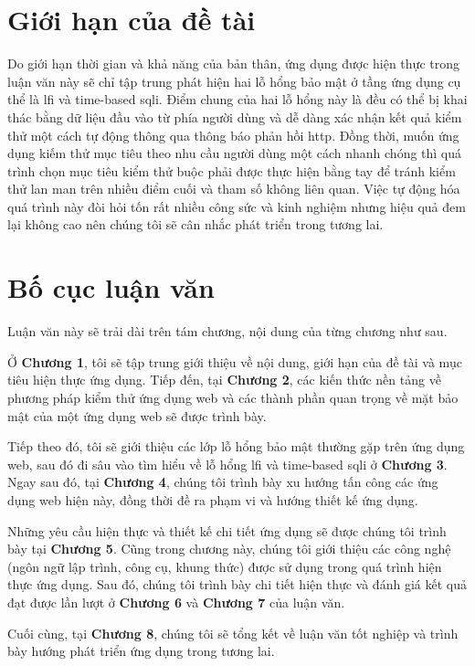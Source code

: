 \section{Giới hạn của đề tài}
Do giới hạn thời gian và khả năng của bản thân, ứng dụng được hiện thực trong luận văn này sẽ chỉ tập trung phát hiện hai lỗ hổng bảo mật ở tầng ứng dụng cụ thể là \acrfull{lfi} và time-based \acrfull{sqli}. Điểm chung của hai lỗ hổng này là đều có thể bị khai thác bằng dữ liệu đầu vào từ phía người dùng và dễ dàng xác nhận kết quả kiểm thử một cách tự động thông qua thông báo phản hồi \acrshort{http}. Đồng thời, muốn ứng dụng kiếm thử mục tiêu theo nhu cầu người dùng một cách nhanh chóng thì quá trình chọn mục tiêu kiểm thử buộc phải được thực hiện bằng tay để tránh kiểm thử lan man trên nhiều điểm cuối và tham số không liên quan. Việc tự động hóa quá trình này đòi hỏi tốn rất nhiều công sức và kinh nghiệm nhưng hiệu quả đem lại không cao nên chúng tôi sẽ cân nhắc phát triển trong tương lai.

\section{Bố cục luận văn}
Luận văn này sẽ trải dài trên tám chương, nội dung của từng chương như sau. \par
Ở \textbf{Chương 1}, tôi sẽ tập trung giới thiệu về nội dung, giới hạn của đề tài và mục tiêu hiện thực ứng dụng. Tiếp đến, tại \textbf{Chương 2}, các kiến thức nền tảng về phương pháp kiểm thử ứng dụng web và các thành phần quan trọng về mặt bảo mật của một ứng dụng web sẽ được trình bày. \par
Tiếp theo đó, tôi sẽ giới thiệu các lớp lỗ hổng bảo mật thường gặp trên ứng dụng web, sau đó đi sâu vào tìm hiểu về lỗ hổng \acrshort{lfi} và time-based \acrshort{sqli} ở \textbf{Chương 3}. Ngay sau đó, tại \textbf{Chương 4}, chúng tôi trình bày xu hướng tấn công các ứng dụng web hiện này, đồng thời đề ra phạm vi và hướng thiết kế ứng dụng.\par
Những yêu cầu hiện thực và thiết kế chi tiết ứng dụng sẽ được chúng tôi trình bày tại \textbf{Chương 5}. Cũng trong chương này, chúng tôi giới thiệu các công nghệ (ngôn ngữ lập trình, công cụ, khung thức) được sử dụng trong quá trình hiện thực ứng dụng. Sau đó, chúng tôi trình bày chi tiết hiện thực và đánh giá kết quả đạt được lần lượt ở \textbf{Chương 6} và \textbf{Chương 7} của luận văn. \par
Cuối cùng, tại \textbf{Chương 8}, chúng tôi sẽ tổng kết về luận văn tốt nghiệp và trình bày hướng phát triển ứng dụng trong tương lai.
